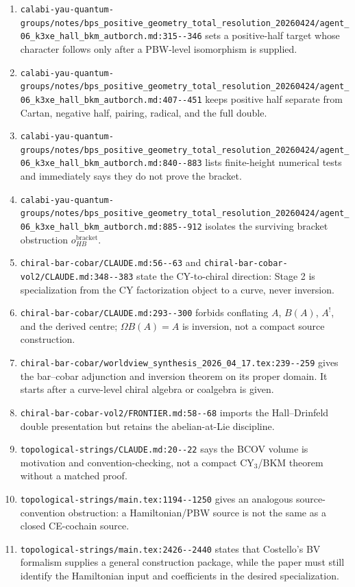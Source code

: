 \begin{enumerate}
\item \verb|calabi-yau-quantum-groups/notes/bps_positive_geometry_total_resolution_20260424/agent_06_k3xe_hall_bkm_autborch.md:315--346|
sets a positive-half target whose character follows only after a
PBW-level isomorphism is supplied.
\item \verb|calabi-yau-quantum-groups/notes/bps_positive_geometry_total_resolution_20260424/agent_06_k3xe_hall_bkm_autborch.md:407--451|
keeps positive half separate from Cartan, negative half, pairing,
radical, and the full double.
\item \verb|calabi-yau-quantum-groups/notes/bps_positive_geometry_total_resolution_20260424/agent_06_k3xe_hall_bkm_autborch.md:840--883|
lists finite-height numerical tests and immediately says they do not
prove the bracket.
\item \verb|calabi-yau-quantum-groups/notes/bps_positive_geometry_total_resolution_20260424/agent_06_k3xe_hall_bkm_autborch.md:885--912|
isolates the surviving bracket obstruction \(o_{HB}^{\mathrm{bracket}}\).
\item \verb|chiral-bar-cobar/CLAUDE.md:56--63| and
\verb|chiral-bar-cobar-vol2/CLAUDE.md:348--383| state the
CY-to-chiral direction: Stage 2 is specialization from the CY
factorization object to a curve, never inversion.
\item \verb|chiral-bar-cobar/CLAUDE.md:293--300| forbids conflating
\(A\), \(B(A)\), \(A^!\), and the derived centre; \(\Omega B(A)=A\) is
inversion, not a compact source construction.
\item \verb|chiral-bar-cobar/worldview_synthesis_2026_04_17.tex:239--259|
gives the bar--cobar adjunction and inversion theorem on its proper
domain.  It starts after a curve-level chiral algebra or coalgebra is
given.
\item \verb|chiral-bar-cobar-vol2/FRONTIER.md:58--68| imports the
Hall--Drinfeld double presentation but retains the abelian-at-Lie
discipline.
\item \verb|topological-strings/CLAUDE.md:20--22| says the BCOV volume
is motivation and convention-checking, not a compact CY\(_3\)/BKM
theorem without a matched proof.
\item \verb|topological-strings/main.tex:1194--1250| gives an analogous
source-convention obstruction: a Hamiltonian/PBW source is not the same
as a closed CE-cochain source.
\item \verb|topological-strings/main.tex:2426--2440| states that
Costello's BV formalism supplies a general construction package, while
the paper must still identify the Hamiltonian input and coefficients in
the desired specialization.
\end{enumerate}

